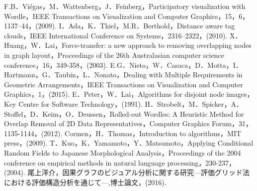 \documentclass[syuuron]{kuee}
\begin{document}
\begin{thebibliography}{数字}
	 F.B．Viégas，M．Wattenberg，J．Feinberg，Participatory visualization with Wordle，IEEE Transactions on Visualization and Computer Graphics，15，6，1137–44，(2009).
	 I．Ada，K．Thiel，M.R．Berthold，Distance aware tag clouds，IEEE International Conference on Systems，2316–2322，(2010).
	 X．Huang，W．Lai，Force-transfer: a new approach to removing overlapping nodes in graph layout，Proceedings of the 26th Australasian computer science conference，16，349-358，(2003).
	 E.G．Nieto，W．Casaca，D．Motta，I．Hartmann，G．Taubin，L．Nonato，Dealing with Multiple Requirements in Geometric Arrangements，IEEE Transactions on Visualization and Computer Graphics，1，(2015).
	 E．Peter，W．Lai，Algorithms for disjoint node images，Key Centre for Software Technology，(1991).
	 H．Strobelt，M．Spicker，A．Stoffel，D．Keim，O．Deussen，Rolled‐out Wordles: A Heuristic Method for Overlap Removal of 2D Data Representatives，Computer Graphics Forum，31，1135-1144，(2012).
	 Cormen，H．Thomas，Introduction to algorithms，MIT press，(2009).
	 T．Kuo，K．Yamamoto，Y．Matsumoto，Applying Conditional Random Fields to Japanese Morphological Analysis，Proceedings of the 2004 conference on empirical methods in natural language processing，230-237，(2004).
	 尾上洋介，因果グラフのビジュアル分析に関する研究—評価グリッド法における評価構造分析を通じて—,博士論文，(2016).
\end{thebibliography}

\appendix
\end{document}

